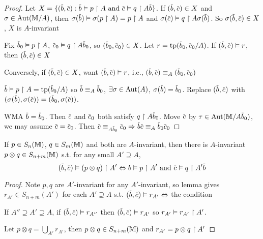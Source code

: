 \documentclass[11pt]{article}
\begin{document}
\begin{proof}
Let \(X=\{(\barb,\barc):\barb\vDash p\uhr A\text{ and }\barc\vDash q\uhr A\barb\}\). If \((\barb,\barc)\in X\)
and \(\sigma\in\operatorname{\text{Aut}}(\mathbb{M}/A)\), then \(\sigma(\barb)\vDash\sigma(p\uhr A)=p\uhr A\) and \(\sigma(\barc)\vDash q\uhr A\sigma(\barb)\). So
\(\sigma(\barb,\barc)\in  X\), \(X\) is \(A\)-invariant

Fix \(\barb_0\vDash p\uhr A\), \(\barc_0\vDash q\uhr A\barb_0\), so \((\barb_0,\barc_0)\in X\).
Let \(r=\tp(\barb_0,\barc_0/A)\). If \((\barb,\barc)\vDash r\), then \((\barb,\barc)\in X\)

Conversely, if \((\barb,\barc)\in X\), want \((\barb,\barc)\vDash r\),
i.e., \((\barb,\barc)\equiv_A(\barb_0,\barc_0)\)

\(\barb\vDash p\uhr A=\tp(\barb_0/A)\) so \(\barb\equiv_A\barb_0\), \(\exists\sigma\in\operatorname{\text{Aut}}(A)\), \(\sigma(\barb)=\barb_0\).
Replace \((\barb,\barc)\) with \((\sigma(\barb),\sigma(\barc))=(\barb_0,\sigma(\barc))\).

WMA \(\barb=\barb_0\). Then \(\barc\) and \(\barc_0\) both satisfy \(q\uhr A\barb_0\).
Move \(\barc\) by \(\tau\in\Aut(\M/A\barb_0)\), we may assume \(\barc=\barc_0\). Then
\(\barc\equiv_{A\barb_0}\barc_0\Rightarrow \barb\barc\equiv_A\barb_0\barc_0\)
\end{proof}

\begin{proposition}[]
If \(p\in S_n(\mathbb{M})\), \(q\in S_m(\mathbb{M})\) and both are \(A\)-invariant, then there
is \(A\)-invariant \(p\otimes q\in S_{n+m}(\mathbb{M})\) s.t. for any small \(A'\supseteq A\),
\begin{equation*}
(\barb,\barc)\vDash(p\otimes q)\uhr A'\Leftrightarrow b\vDash p\uhr A'\text{ and }\barc\vDash q\uhr A'\barb
\end{equation*}
\end{proposition}

\begin{proof}
Note \(p,q\) are \(A'\)-invariant for any \(A'\)-invariant, so lemma
gives \(r_{A'}\in S_{n+m}(A')\) for each \(A'\supseteq A\) s.t. \((\barb,\barc)\vDash r_{A'}\Leftrightarrow\) the condition

If \(A''\supseteq A'\supseteq A\), if \((\barb,\barc)\vDash r_{A''}\) then \((\barb,\barc)\vDash r_{A'}\)
so \(r_{A'}\vDash r_{A'}\upharpoonright A'\).

Let \(p\otimes q=\bigcup_{A'}r_{A'}\), then \(p\otimes q\in S_{n+m}(\mathbb{M})\) and \(r_{A'}=p\otimes q\upharpoonright A'\)
\end{proof}
\end{document}
